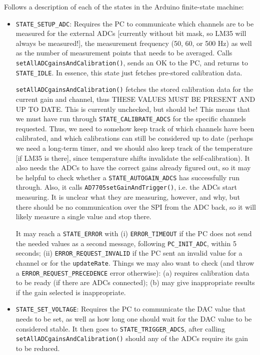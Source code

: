 \documentclass[11pt,a4paper,english]{article}
\begin{document}
\vspace*{\baselineskip}
\noindent{}Follows a description of each of the states in the Arduino finite-state machine:
\begin{itemize}
\item \texttt{STATE\_SETUP\_ADC}: Requires the PC to communicate which channels are to be measured for the external ADCs [currently without bit mask, so LM35 will always be measured!], the measurement frequency (50, 60, or 500 Hz) as well as the number of measurement points that needs to be averaged. Calls \texttt{setAllADCgainsAndCalibration()}, sends an OK to the PC, and returns to \texttt{STATE\_IDLE}. In essence, this state just fetches pre-stored calibration data.

	\texttt{setAllADCgainsAndCalibration()} fetches the stored calibration data for the current gain and channel, thus THESE VALUES MUST BE PRESENT AND UP TO DATE. This is currently unchecked, but should be! This means that we must have run through \texttt{STATE\_CALIBRATE\_ADCS} for the specific channels requested. Thus, we need to somehow keep track of which channels have been calibrated, and which calibrations can still be considered up to date (perhaps we need a long-term timer, and we should also keep track of the temperature [if LM35 is there], since temperature shifts invalidate the self-calibration). It also needs the ADCs to have the correct gains already figured out, so it may be helpful to check whether a \texttt{STATE\_AUTOGAIN\_ADCS} has successfully run through. Also, it calls \texttt{AD7705setGainAndTrigger()}, i.e. the ADCs start measuring. It is unclear what they are measuring, however, and why, but there should be no communication over the SPI from the ADC back, so it will likely measure a single value and stop there.

	It may reach a \texttt{STATE\_ERROR} with (i) \texttt{ERROR\_TIMEOUT} if the PC does not send the needed values as a second message, following \texttt{PC\_INIT\_ADC}, within 5 seconds; (ii) \texttt{ERROR\_REQUEST\_INVALID} if the PC sent an invalid value for a channel or for the \texttt{updateRate}. Things we may also want to check (and throw a \texttt{ERROR\_REQUEST\_PRECEDENCE} error otherwise): (a) requires calibration data to be ready (if there are ADCs connected); (b) may give inappropriate results if the gain selected is inappropriate.

\item \texttt{STATE\_SET\_VOLTAGE}: Requires the PC to communicate the DAC value that needs to be set, as well as how long one should wait for the DAC value to be considered stable. It then goes to \texttt{STATE\_TRIGGER\_ADCS}, after calling \texttt{setAllADCgainsAndCalibration()} should any of the ADCs require its gain to be reduced.
	

\end{itemize}
\end{document}
